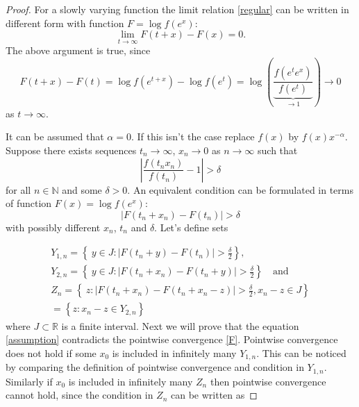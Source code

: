 \documentclass[english,12pt,a4paper,pdftex,sci,utf8]{aaltothesis} %
\begin{document}
\begin{proof}


For a slowly varying function the limit relation \eqref{regular} can be written in different form with function $F=\log f(e^x)$:
\begin{equation}
\lim_{t \rightarrow \infty} F(t+x)-F(x) = 0.
\label{F}
\end{equation}
The above argument is true, since
\begin{equation*}
F(t+x)-F(t) = \log f(e^{t+x}) - \log f(e^{t}) = \log \left(\underbrace{\frac{f(e^te^x)}{f(e^t)}}_{\rightarrow 1}\right) \rightarrow 0
\end{equation*}
as $t \rightarrow \infty$.





It can be assumed that $\alpha=0$. If this isn't the case replace $f(x)$ by $f(x)x^{-\alpha}$. Suppose there exists sequences $t_n \rightarrow \infty$, $x_n \rightarrow 0$ as $n \rightarrow \infty$ such that
\begin{equation*}
\left| \frac{f(t_nx_n)}{f(t_n)} - 1 \right| > \delta
\end{equation*}
for all $n \in \mathbb{N}$ and some $\delta>0$. An equivalent condition can be formulated in terms of function $F(x) = \log f(e^x)$:
\begin{equation}
\left| F(t_n+x_n) - F(t_n) \right| > \delta
\label{assumption}
\end{equation}
with possibly different $x_n$, $t_n$ and $\delta$. Let's define sets

\begin{align*}
Y_{1,n} = \left\{ \ y \in J: \left| F(t_n+y)-F(t_n) \right| > \frac{\delta}{2} \right\}, \\
Y_{2,n} = \left\{ \ y \in J: \left| F(t_n+x_n)-F(t_n+y) \right| > \frac{\delta}{2} \right\} \quad  \textrm{and} \\
Z_n = \left\{ \ z: \left| F(t_n+x_n)-F(t_n+x_n-z) \right| > \frac{\delta}{2}, x_n-z \in J \right\} \\
= \left\{ z: x_n-z \in Y_{2,n} \right\}
\end{align*}
where $J \subset \mathbb{R}$ is a finite interval. Next we will prove that the equation \eqref{assumption} contradicts the pointwise convergence \eqref{F}. Pointwise convergence does not hold if some $x_0$ is included in infinitely many $Y_{1,n}$. This can be noticed by comparing the definition of pointwise convergence and condition in $Y_{1,n}$. Similarly if $x_0$ is included in infinitely many $Z_n$ then pointwise convergence cannot hold, since the condition in $Z_{n}$ can be written as


\end{proof}
\end{document}

